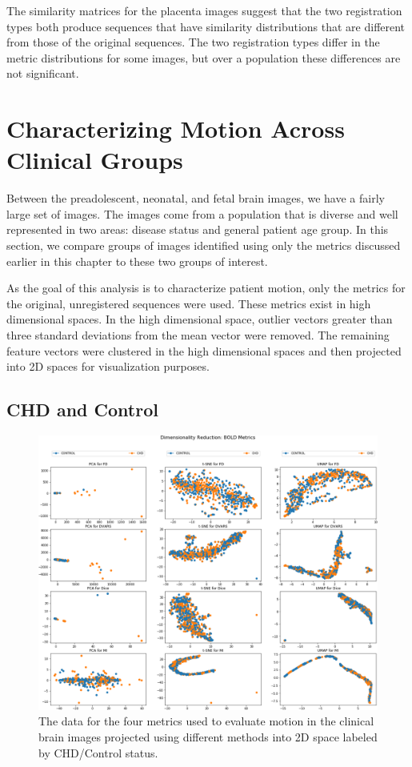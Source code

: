 The similarity matrices for the placenta images suggest that the two registration types both produce sequences that have similarity distributions that are different from those of the original sequences. The two registration types differ in the metric distributions for some images, but over a population these differences are not significant.

\section{Characterizing Motion Across Clinical Groups}

Between the preadolescent, neonatal, and fetal brain images, we have a fairly large set of images. The images come from a population that is diverse and well represented in two areas: disease status and general patient age group. In this section, we compare groups of images identified using only the metrics discussed earlier in this chapter to these two groups of interest. 

As the goal of this analysis is to characterize patient motion, only the metrics for the original, unregistered sequences were used. These metrics exist in high dimensional spaces. In the high dimensional space, outlier vectors greater than three standard deviations from the mean vector were removed. The remaining feature vectors were clustered in the high dimensional spaces and then projected into 2D spaces for visualization purposes.

\subsection{CHD and Control}

\begin{figure}[t!]
\centering
\includegraphics[width=.9\textwidth]{6/figures/bold-2d-all-cohort.png}
\caption{The data for the four metrics used to evaluate motion in the clinical brain images projected using different methods into 2D space labeled by CHD/Control status.}
\label{fig:mocha-cohorts-data-2d}
\end{figure}

